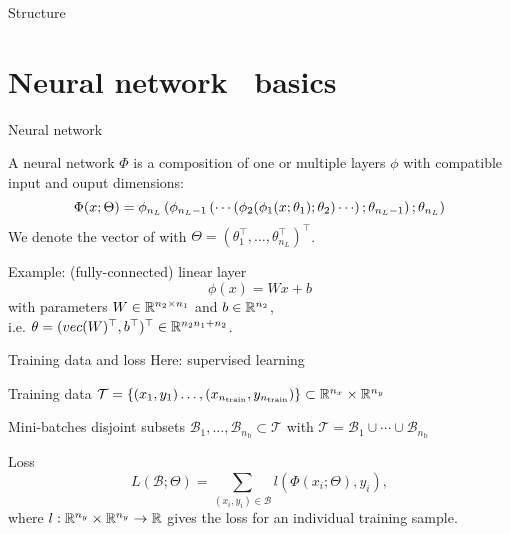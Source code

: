 \begin{frame}{Structure}
  \tableofcontents
\end{frame}

\section{Neural network ~\newline basics}

\begin{frame}{Neural network}
  \begin{definition}
    A neural network $\Phi$ is a composition of one or multiple layers $\phi$ 
    with compatible input and ouput dimensions:
    \begin{equation*}
      \Phi(x;\Theta) = \phi_{n_L} \lb \phi_{n_L-1} \lb \cdots
      \lb \phi_2(
      \phi_1(x;\theta_1); \theta_2 ) \cdots \rb ; \theta_{n_L-1} \rb ; \theta_{n_L} \rb
    \end{equation*}
    We denote the vector of
     with $\Theta = (\theta_1^\top, \dots, \theta_{n_L}^\top)^\top$.
  \end{definition}
  
  Example: (fully-connected) linear layer
  \begin{equation*}
    \phi(x) = Wx +b
  \end{equation*}
  with parameters $W \in \mathbb{R}^{n_2 \times n_1}$ 
  and $b \in \mathbb{R}^{n_2}$,\\
  i.e. $\theta = (vec(W)^\top, b^\top)^\top \in \mathbb{R}^{n_2 n_1 + n_2}$.
\end{frame}

\begin{frame}{Training data and loss}
  Here: supervised learning

  \begin{block}{Training data}
    $\mathcal{T} = \{(x_1, y_1) \dots, (x_{n_{\text{train}}},y_{n_{\text{train}}}) \}
   \subset \mathbb{R}^{n_x} \times \mathbb{R}^{n_y}$
  \end{block}

  \begin{block}{Mini-batches}
    disjoint subsets $\mathcal{B}_1, \dots, \mathcal{B}_{n_{\text{b}}}
    \subset \mathcal{T}$
    with $\mathcal{T} = \mathcal{B}_1 \cup \cdots \cup \mathcal{B}_{n_{\text{b}}}$
  \end{block}

  \begin{block}{Loss}
    \begin{equation*}
      L(\mathcal{B}; \Theta) = \sum_{(x_i,y_i) \in \mathcal{B}} l(\Phi(x_i; \Theta), y_i),
    \end{equation*}
    where $l : \mathbb{R}^{n_y} \times \mathbb{R}^{n_y} \to \mathbb{R}$ gives the loss for an 
    individual training sample.
  \end{block} 
\end{frame}

